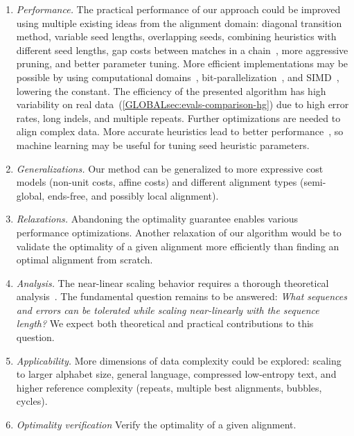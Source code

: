 \begin{enumerate}
    \item \emph{Performance.} The practical performance of our \A approach could
        be improved using multiple existing ideas from the alignment domain:
        diagonal transition method, variable seed lengths, overlapping seeds,
        combining heuristics with different seed lengths, gap costs between
        matches in a chain~\citep{ukkonen1985algorithms,wilbur1984context}, more
        aggressive pruning, and better parameter tuning. More efficient
        implementations may be possible by using computational
        domains~\citep{spouge1989speeding},
        bit-parallelization~\citep{myers1999fast}, and
        SIMD~\citep{marco2021fast}, lowering the \A constant. The efficiency of
        the presented algorithm has high variability on real
        data~(\cref{GLOBALsec:evals-comparison-hg}) due to high error rates,
        long indels, and multiple repeats. Further optimizations are needed to
        align complex data. More accurate heuristics lead to better \A
        performance~\cite{pearl_discovery_1983}, so machine learning may be
        useful for tuning seed heuristic parameters.
    \item \emph{Generalizations.} Our method can be generalized to more
        expressive cost models (non-unit costs, affine costs) and different alignment
        types (semi-global, ends-free, and possibly local alignment).
    \item \emph{Relaxations.} Abandoning the optimality guarantee
        enables various performance optimizations. Another relaxation
        of our algorithm would be to validate the optimality of a given alignment more
        efficiently than finding an optimal alignment from scratch.
    \item \emph{Analysis.} The near-linear scaling behavior requires a thorough
        theoretical analysis~\citep{medvedev2022limitations}. The fundamental
        question remains to be answered: \emph{What sequences and 
        errors can be tolerated while scaling near-linearly with the
        sequence length?} We expect both theoretical and practical contributions
        to this question.
    \item \emph{Applicability.} More dimensions of data complexity could be
        explored: scaling to larger alphabet size, general language, compressed
        low-entropy text, and higher reference complexity (repeats, multiple best
        alignments, bubbles, cycles).
    \item \emph{Optimality verification} Verify the optimality of a given alignment.
\end{enumerate}

